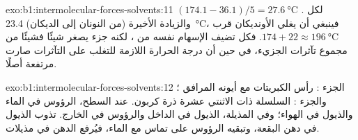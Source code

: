 \begin{solution}{exo:b1:intermolecular-forces-solvents:11}
$(174.1 - 36.1)/5 = \qty{27.6}{\celsius}$ لكل . والزيادة
الأخيرة (من النونان إلى الديكان) \qty{23.4}{\celsius}، فينبغي أن يغلي الأونديكان
قرب $174 + 22 \approx \qty{196}{\celsius}$. فكل  تضيف
الإسهام نفسه من ، لكنه جزء يصغر شيئًا فشيئًا من مجموع
تآثرات الجزيء، في حين أن درجة الحرارة اللازمة للتغلب على
التآثرات صارت مرتفعة أصلًا.
\end{solution}

\begin{solution}{exo:b1:intermolecular-forces-solvents:12}
الجزء : رأس الكبريتات  مع أيونه المرافق ؛
والجزء : السلسلة ذات الاثنتي عشرة ذرة كربون. عند السطح، الرؤوس في
الماء والذيول في الهواء؛ وفي المذيلة، الذيول في الداخل والرؤوس في الخارج.
تذوب الذيول في دهن البقعة، وتبقيه الرؤوس على
تماس مع الماء، فيُرفع الدهن في مذيلات.
\end{solution}

